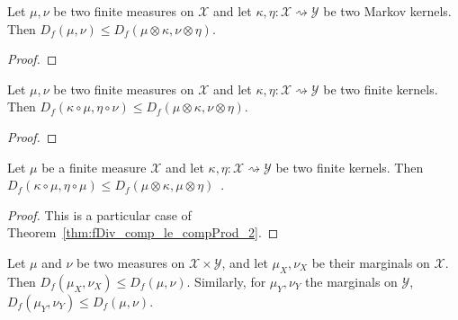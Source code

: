 \begin{theorem}
  \label{thm:fDiv_le_compProd_2}
  Let $\mu, \nu$ be two finite measures on $\mathcal X$ and let $\kappa, \eta : \mathcal X \rightsquigarrow \mathcal Y$ be two Markov kernels.
  Then $D_f(\mu, \nu) \le D_f(\mu \otimes \kappa, \nu \otimes \eta)$.
\end{theorem}

\begin{proof}%
{}

\end{proof}


\begin{theorem}
  \label{thm:fDiv_comp_le_compProd_2}
  Let $\mu, \nu$ be two finite measures on $\mathcal X$ and let $\kappa, \eta : \mathcal X \rightsquigarrow \mathcal Y$ be two finite kernels.
  Then $D_f(\kappa \circ \mu, \eta \circ \nu) \le D_f(\mu \otimes \kappa, \nu \otimes \eta)$.
\end{theorem}

\begin{proof}%
{}

\end{proof}


\begin{theorem}
  \label{thm:fDiv_comp_le_condFDiv_2}
  Let $\mu$ be a finite measure $\mathcal X$ and let $\kappa, \eta : \mathcal X \rightsquigarrow \mathcal Y$ be two finite kernels.
  Then $D_f(\kappa \circ \mu, \eta \circ \mu) \le D_f(\mu \otimes \kappa, \mu \otimes \eta)$~.
\end{theorem}

\begin{proof}%
{}
This is a particular case of Theorem~\ref{thm:fDiv_comp_le_compProd_2}.
\end{proof}


\begin{theorem}[Marginals]
  \label{thm:fDiv_fst_le_2}
  Let $\mu$ and $\nu$ be two measures on $\mathcal X \times \mathcal Y$, and let $\mu_X, \nu_X$ be their marginals on $\mathcal X$.
  Then $D_f(\mu_X, \nu_X) \le D_f(\mu, \nu)$.
  Similarly, for $\mu_Y, \nu_Y$ the marginals on $\mathcal Y$, $D_f(\mu_Y, \nu_Y) \le D_f(\mu, \nu)$.
\end{theorem}

